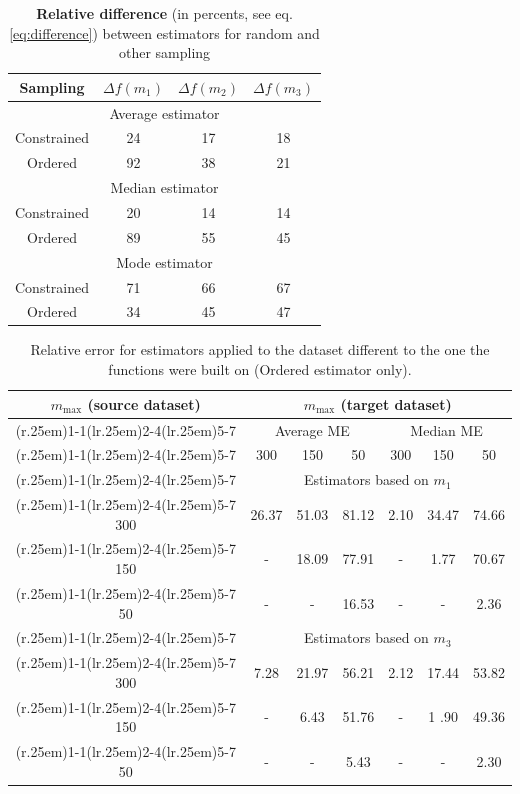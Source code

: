 \documentclass{aastex}
\newcommand{\Mmax}{m_{\mathrm{max}}}
\newcommand{\customruletwo}{\cmidrule(r{.25em}){1-1}\cmidrule(lr{.25em}){2-4}\cmidrule(lr{.25em}){5-7}}
\begin{document}
\begin{table}
\begin{center}
\caption{\textbf{Relative difference} (in percents, see eq. \ref{eq:difference}) between estimators for random and other sampling} \label{tbl:variance}
\begin{tabular}{cccc} \\ \toprule
Sampling & $\Delta f(m_1)$ & $\Delta f(m_2)$ & $\Delta f(m_3)$ \\ \midrule
\multicolumn{4}{c}{Average estimator} \\ \midrule
Constrained & 24 & 17 & 18  \\ \midrule
Ordered     & 92 & 38 & 21  \\ \midrule
\multicolumn{4}{c}{Median estimator} \\ \midrule
Constrained & 20 & 14 & 14  \\ \midrule
Ordered     & 89 & 55 & 45  \\ \midrule
\multicolumn{4}{c}{Mode estimator} \\ \midrule
Constrained & 71 & 66 & 67  \\ \midrule
Ordered     & 34 & 45 & 47  \\ \bottomrule
\end{tabular}
\end{center}
\end{table}

\begin{table}
\begin{center}
\caption{Relative error for estimators applied to the dataset different to the one the functions were built on (Ordered estimator only).} \label{tbl:wrong_data}
\begin{tabular}{ccccccc} \\ \toprule
$\Mmax$ (source dataset) & \multicolumn{6}{c}{$\Mmax$ (target dataset)} \\ \customruletwo
 & \multicolumn{3}{c}{Average ME} & \multicolumn{3}{c}{Median ME} \\ \customruletwo
 & 300 & 150 & 50 & 300 & 150 & 50 \\ \customruletwo
 & \multicolumn{6}{c}{Estimators based on $m_1$} \\ \customruletwo
 300 & 26.37 & 51.03 & 81.12 & 2.10 & 34.47 & 74.66  \\ \customruletwo
 150 &     - & 18.09 & 77.91 &     - & 1.77 & 70.67  \\ \customruletwo
  50 &     - &     - & 16.53 &     - &     - & 2.36 \\ \customruletwo
 & \multicolumn{6}{c}{Estimators based on $m_3$} \\ \customruletwo
 300 & 7.28 & 21.97 & 56.21 & 2.12 & 17.44 & 53.82  \\ \customruletwo
 150 &    - &  6.43 & 51.76 &    - & 1 .90 & 49.36  \\ \customruletwo
  50 &    - &    -  & 5.43  &    - &     - &  2.30 \\ \bottomrule
\end{tabular}
\end{center}
\end{table}
\end{document}
